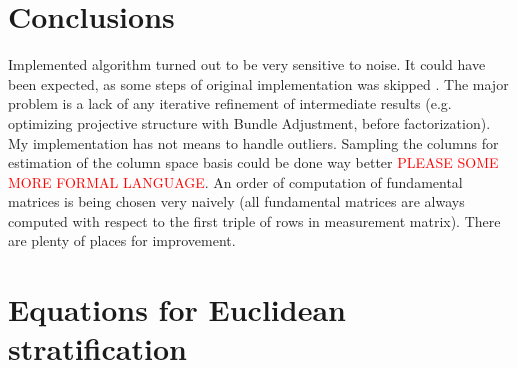 \documentclass[12pt]{article}
\begin{document}
\section{Conclusions}

Implemented algorithm turned out to be very sensitive to noise. It could have
been expected, as  some steps of original implementation was skipped
\cite{svoboda05}. The major problem is a   lack of any iterative refinement of
intermediate results (e.g. optimizing projective structure   with Bundle
Adjustment, before factorization). My implementation has not means to handle
outliers. Sampling the columns for estimation of the column space basis could be
done way better \textcolor{red}{PLEASE SOME MORE FORMAL LANGUAGE}. An order of computation of fundamental matrices is being
chosen very naively (all    fundamental matrices are always computed with
respect to the first triple of rows in    measurement matrix). There are plenty
of places for improvement.




\newpage

\section{Equations for Euclidean stratification}
\end{document}
